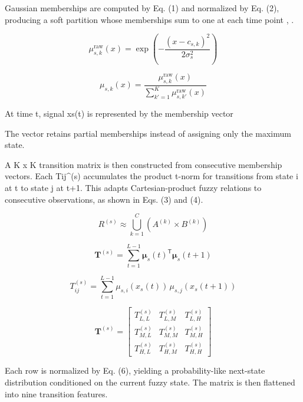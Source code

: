 \documentclass[runningheads]{llncs}
\begin{document}
Gaussian memberships are computed by Eq. (1) and normalized by Eq. (2), producing a soft partition whose memberships sum to one at each time point \cite{ref7}, \cite{ref18}.

\begin{equation}\mu_{s,k}^{\mathrm{raw}}(x)=\exp\!\left(-\frac{(x-c_{s,k})^2}{2\sigma_s^2}\right)\tag{1}\end{equation}

\begin{equation}\mu_{s,k}(x)=\frac{\mu_{s,k}^{\mathrm{raw}}(x)}{\sum_{k\prime=1}^{K}\mu_{s,k\prime}^{\mathrm{raw}}(x)}\tag{2}\end{equation}

At time t, signal xs(t) is represented by the membership vector

The vector retains partial memberships instead of assigning only the maximum state.

A K x K transition matrix is then constructed from consecutive membership vectors. Each Tij\textasciicircum{}(s) accumulates the product t-norm for transitions from state i at t to state j at t+1. This adapts Cartesian-product fuzzy relations \cite{ref6} to consecutive observations, as shown in Eqs. (3) and (4).

\begin{equation}R^{(s)}\approx\bigcup_{k=1}^{C}\left(A^{(k)}\times B^{(k)}\right)\tag{3}\end{equation}

\begin{equation*}\mathbf{T}^{(s)}=\sum_{t=1}^{L-1}\boldsymbol{\mu}_s(t)^{\mathsf T}\boldsymbol{\mu}_s(t+1)\end{equation*}

\begin{equation}T_{ij}^{(s)}=\sum_{t=1}^{L-1}\mu_{s,i}(x_s(t))\,\mu_{s,j}(x_s(t+1))\tag{4}\end{equation}



\begin{equation}\mathbf{T}^{(s)}=\begin{bmatrix}T_{L,L}^{(s)}&T_{L,M}^{(s)}&T_{L,H}^{(s)}\\T_{M,L}^{(s)}&T_{M,M}^{(s)}&T_{M,H}^{(s)}\\T_{H,L}^{(s)}&T_{H,M}^{(s)}&T_{H,H}^{(s)}\end{bmatrix}\tag{5}\end{equation}

Each row is normalized by Eq. (6), yielding a probability-like next-state distribution conditioned on the current fuzzy state. The matrix is then flattened into nine transition features.
\end{document}
